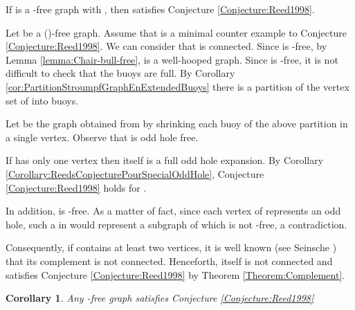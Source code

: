 \documentclass{amsart}
\newtheorem{cor}[thm]{Corollary}
\theoremstyle{definition}
\theoremstyle{remark}
\newenvironment{prf}{{\bf \noindent Proof. } }{\hfill\\}
\newcommand{\wh}{well-hooped\xspace}
\newcommand{\extB}{buoy\xspace}
\newcommand{\extBs}{buoys\xspace}
\begin{document}
 \begin{thm} \label{Theorem:Bull_House_Chair}  If  is a -free graph with , then  satisfies Conjecture \ref{Conjecture:Reed1998}.
\end{thm}
\begin{prf}
Let  be a ()-free graph. Assume that  is a minimal counter example to Conjecture \ref{Conjecture:Reed1998}.
We can consider that  is connected. 
Since  is -free, by Lemma \ref{lemma:Chair-bull-free},  is a \wh graph. Since  is -free, it is not difficult to check that the \extBs are full.
By Corollary \ref{cor:PartitionStroumpfGraphEnExtendedBuoys} there is a partition of the vertex set of  into \extBs.

Let  be the graph obtained from  by shrinking each \extB of the above partition in a single vertex. Observe that  is  odd hole free.

If  has only one vertex then  itself is a full odd hole expansion. By Corollary \ref{Corollary:ReedsConjecturePourSpecialOddHole}, Conjecture \ref{Conjecture:Reed1998} holds for .

In addition,  is -free. As a matter of fact, since each vertex of  represents an odd hole, such a  in  would represent a subgraph of  which is not -free, a contradiction.

Consequently, if  contains at least two vertices, it is well known (see Seinsche \cite{Sei1974}) that its complement
is not connected.  Henceforth,  itself is not connected and  satisfies Conjecture \ref{Conjecture:Reed1998} by Theorem \ref{Theorem:Complement}.
\end{prf}

\begin{cor}  \cite{AraKarSub2011} Any -free graph satisfies Conjecture \ref{Conjecture:Reed1998}
\end{cor}





\end{document}
